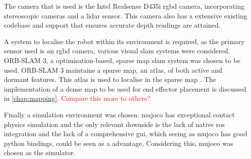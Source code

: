     The camera that is used is the Intel Realsense D435i \ac{rgbd} camera, incorporating stereoscopic cameras and a \ac{lidar} sensor.
    This camera also has a extensive existing codebase and support that ensures accurate depth readings are attained.

    A system to localise the robot within its environment is required, as the primary sensor used is an \ac{rgbd} camera, various visual
    \ac{slam} systems were considered. ORB-SLAM 3, a optimisation-based, sparse map \ac{slam} system was chosen to be used. ORB-SLAM 3 maintains
    a sparse map, an atlas, of both active and dormant features. This atlas is used to localise in the sparse map \citep{macario2022comprehensive}.
    The implementation of a dense map to be used for end effector placement is discussed in \autoref{chap:mapping}.
    \textcolor{red}{Compare this more to others?}

    Finally a simulation environment was chosen. \ac{mujoco} has exceptional contact physics simulation and the only relevant
    downside is the lack of native \ac{ros} integration and the lack of a comprehensive \ac{gui}, which seeing as \ac{mujoco} has good python bindings,
    could be seen as a advantage. Considering this, \ac{mujoco} was chosen as the simulator.

